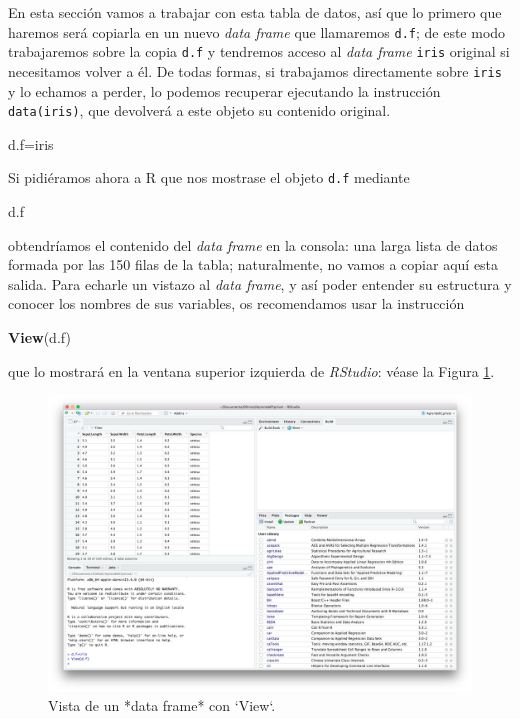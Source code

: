 \documentclass[
]{book}
\newenvironment{Shaded}{\begin{snugshade}}{\end{snugshade}}
\newcommand{\KeywordTok}[1]{\textcolor[rgb]{0.13,0.29,0.53}{\textbf{#1}}}
\newcommand{\NormalTok}[1]{#1}
\theoremstyle{definition}
\theoremstyle{definition}
\theoremstyle{definition}
\theoremstyle{remark}
\begin{document}
En esta sección vamos a trabajar con esta tabla de datos, así que lo primero que haremos será copiarla en un nuevo \emph{data frame} que llamaremos \texttt{d.f}; de este modo trabajaremos sobre la copia \texttt{d.f} y tendremos acceso al \emph{data frame} \texttt{iris} original si necesitamos volver a él. De todas formas, si trabajamos directamente sobre \texttt{iris} y lo echamos a perder, lo podemos recuperar ejecutando la instrucción \texttt{data(iris)}, que devolverá a este objeto su contenido original.

\begin{Shaded}
\begin{Highlighting}[]
\NormalTok{d.f=iris}
\end{Highlighting}
\end{Shaded}

Si pidiéramos ahora a R que nos mostrase el objeto \texttt{d.f} mediante

\begin{Shaded}
\begin{Highlighting}[]
\NormalTok{d.f}
\end{Highlighting}
\end{Shaded}

obtendríamos el contenido del \emph{data frame} en la consola: una larga lista de datos formada por las 150 filas de la tabla; naturalmente, no vamos a copiar aquí esta salida. Para echarle un vistazo al \emph{data frame}, y así poder entender su estructura y conocer los nombres de sus variables, os recomendamos usar la instrucción

\begin{Shaded}
\begin{Highlighting}[]
\KeywordTok{View}\NormalTok{(d.f)}
\end{Highlighting}
\end{Shaded}

que lo mostrará en la ventana superior izquierda de \emph{RStudio}:
véase la Figura \ref{fig:View}.

\begin{figure}

{\centering \includegraphics[width=0.9\linewidth]{AprendeR-Parte-I_files/figure-html/View} 

}

\caption{Vista de un *data frame* con `View`.}\label{fig:View}
\end{figure}
\end{document}
